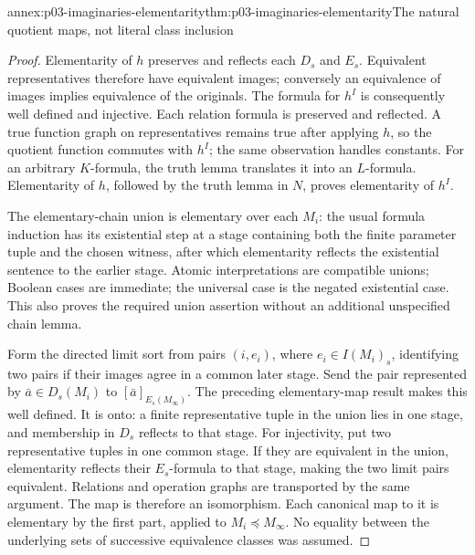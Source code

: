 \begin{annexitem}{annex:p03-imaginaries-elementarity}{thm:p03-imaginaries-elementarity}{The natural quotient maps, not literal class inclusion}
\begin{proof}
Elementarity of \(h\) preserves and reflects each \(D_s\) and \(E_s\).
Equivalent representatives therefore have equivalent images; conversely an
equivalence of images implies equivalence of the originals. The formula for
\(h^I\) is consequently well defined and injective. Each relation formula
is preserved and reflected. A true function graph on representatives remains
true after applying \(h\), so the quotient function commutes with \(h^I\);
the same observation handles constants. For an arbitrary \(K\)-formula,
the truth lemma translates it into an \(L\)-formula. Elementarity of
\(h\), followed by the truth lemma in \(N\), proves elementarity of
\(h^I\).

The elementary-chain union is elementary over each \(M_i\): the usual
formula induction has its existential step at a stage containing both the
finite parameter tuple and the chosen witness, after which elementarity
reflects the existential sentence to the earlier stage. Atomic interpretations
are compatible unions; Boolean cases are immediate; the universal case is
the negated existential case. This also proves the required union assertion
without an additional unspecified chain lemma.

Form the directed limit sort from pairs \((i,e_i)\), where
\(e_i\in I(M_i)_s\), identifying two pairs if their images agree in a
common later stage. Send the pair represented by \(\bar a\in D_s(M_i)\)
to \([\bar a]_{E_s(M_\infty)}\). The preceding elementary-map result
makes this well defined. It is onto: a finite representative tuple in the union
lies in one stage, and membership in \(D_s\) reflects to that stage.
For injectivity, put two representative tuples in one common stage. If they
are equivalent in the union, elementarity reflects their \(E_s\)-formula
to that stage, making the two limit pairs equivalent. Relations and operation
graphs are transported by the same argument. The map is therefore an
isomorphism. Each canonical map to it is elementary by the first part, applied
to \(M_i\preccurlyeq M_\infty\). No equality between the underlying
sets of successive equivalence classes was assumed.
\end{proof}
\end{annexitem}

